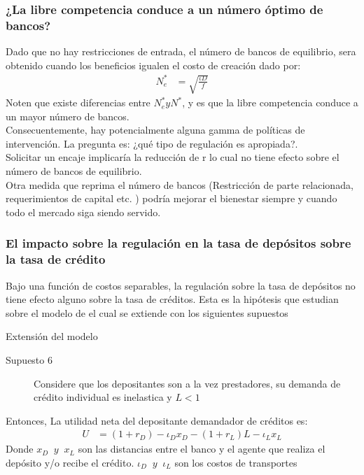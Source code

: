 \documentclass[10pt, xcolor=table, x11names]{beamer}
\begin{document}
\begin{frame}
    \frametitle{{\normalsize ¿La libre competencia conduce a un número óptimo de bancos?} {}}
   Dado que no hay restricciones de entrada, el número de bancos de equilibrio, sera obtenido cuando los beneficios igualen el costo de creación dado por:
   \begin{align}
   N_{e}^{*}&=\sqrt{\frac{\iota D}{f}}\nonumber
   \end{align} 
   Noten que existe diferencias entre $N_{e}^{*} y N^{*}$, y es que la libre competencia conduce a un mayor número de bancos.\\
   Consecuentemente, hay potencialmente alguna gamma de políticas de intervención. La pregunta es: ¿qué tipo de regulación es apropiada?.\\
   Solicitar un encaje implicaría la reducción de r lo cual no tiene efecto sobre el número de bancos de equilibrio.\\ 
   Otra medida que reprima el número de bancos (Restricción de parte relacionada, requerimientos de capital etc. ) podría mejorar el bienestar 
   siempre y cuando todo el mercado siga siendo servido. 
\end{frame}



\begin{frame}
    \frametitle{{\normalsize El impacto sobre la regulación en la tasa de depósitos sobre la tasa de crédito} {}}
    
    Bajo una función de costos separables, la regulación sobre la tasa de depósitos no tiene efecto alguno sobre la tasa de créditos. Esta es la hipótesis que estudian \cite{Chiappori1995} sobre el modelo de \cite{Salop1979} el cual se extiende con los siguientes supuestos
     \begin{block} {Extensión del modelo}
        \begin{description}
           \item[Supuesto 6]  Considere que los depositantes son a la vez prestadores, su demanda de crédito individual es inelastica y $L<1$ 
                      
        \end{description}
        
    \end{block}	
    Entonces, La utilidad neta del depositante demandador de créditos es:
    \begin{align}
    U&=(1+r_{D})-\iota_{D}x_{D}-(1+r_{L})L-\iota_{L}x_{L}
    \end{align} 
    Donde $x_{D}\;\;y\;\;x_{L}$ son las distancias entre el banco y el agente que realiza el depósito y/o recibe el crédito. $\iota_{D}\;\;y\;\;\iota_{L}$ son los costos de transportes
     
\end{frame}
\end{document}
